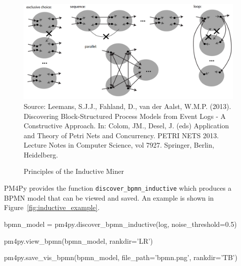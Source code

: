 \begin{figure}
\includegraphics[width=\textwidth]{screen2.png}
\scriptsize 
Source: Leemans, S.J.J., Fahland, D., van der Aalst, W.M.P. (2013). Discovering Block-Structured Process Models from Event Logs - A Constructive Approach. In: Colom, JM., Desel, J. (eds) Application and Theory of Petri Nets and Concurrency. PETRI NETS 2013. Lecture Notes in Computer Science, vol 7927. Springer, Berlin, Heidelberg.
\caption{Principles of the Inductive Miner}
\label{fig:inductive}
\end{figure}

PM4Py provides the function \texttt{discover\_bpmn\_inductive} which produces a BPMN model that can be viewed and saved. An example is shown in Figure~\ref{fig:inductive_example}.

\begin{samepage}
\begin{pythoncode}
bpmn_model = pm4py.discover_bpmn_inductive(log, noise_threshold=0.5)

pm4py.view_bpmn(bpmn_model, rankdir='LR')

pm4py.save_vis_bpmn(bpmn_model, file_path='bpmn.png', rankdir='TB')
\end{pythoncode}
\end{samepage}

